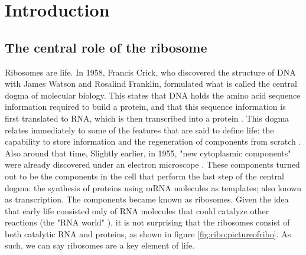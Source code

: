 
\section{Introduction}

\subsection{The central role of the ribosome}

Ribosomes are life.
%
In 1958, Francis Crick, who discovered the structure of DNA with James Watson and Rosalind Franklin,
formulated what is called the central dogma of molecular biology.
This states 
that DNA holds the amino acid sequence information required to build a protein, and that this sequence information is first translated to RNA, which is then transcribed into a protein \cite{Crick1958}.
% 
This dogma relates immediately to some of the features that are said to define life: 
the capability to store information and 
the regeneration of components from scratch \cite{Lawrence2005, Koshland2002}.
%
Also around that time, 
Slightly earlier, in 1955, "new cytoplasmic components" were already discovered under an electron microscope \cite{Palade1955}.
These components turned out to be the components in the cell that perform the last step of the central dogma: 
the synthesis of proteins using mRNA molecules as templates; also known as transcription.
The components became known as ribosomes.
%
Given the idea that early life consisted only of RNA molecules that could catalyze other reactions (the "RNA world" \cite{Campbell2002}), it is not surprising that the ribosomes 
consist of both catalytic RNA and proteins,
as shown in figure \ref{fig:ribo:pictureofribo}.
%
As such, we can say ribosomes are a key element of life.


